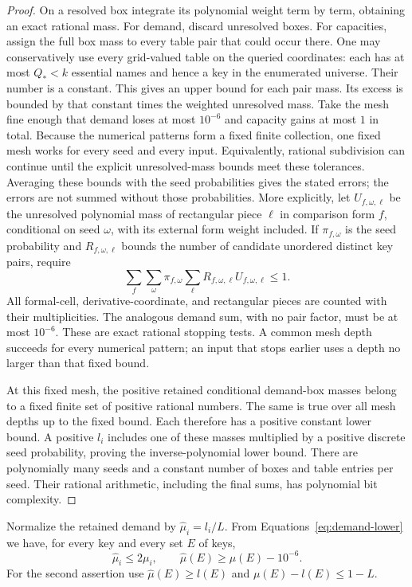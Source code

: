 \begin{proof}
On a resolved box integrate its polynomial weight term by term, obtaining
an exact rational mass.  For demand, discard unresolved boxes.  For
capacities, assign the full box mass to every table pair that could occur
there. One may conservatively use every grid-valued table on the queried
coordinates: each has at most $Q_*<k$ essential names and hence a key in
the enumerated universe. Their number is a constant. This gives an upper bound for
each pair mass.  Its excess is bounded by that constant times the weighted
unresolved mass.  Take the mesh fine enough that demand loses at most
$10^{-6}$ and capacity gains at most $1$ in total.  Because the numerical
patterns form a fixed finite collection, one fixed mesh works for every
seed and every input.  Equivalently, rational subdivision can continue
until the explicit unresolved-mass bounds meet these tolerances.  Averaging
these bounds with the seed probabilities gives the stated errors; the
errors are not summed without those probabilities. More explicitly, let
$U_{f,\omega,\ell}$ be the unresolved polynomial mass of rectangular
piece $\ell$ in comparison form $f$, conditional on seed $\omega$,
with its external form weight included. If $\pi_{f,\omega}$ is the seed
probability and $R_{f,\omega,\ell}$ bounds the number of candidate
unordered distinct key pairs, require
\[
 \sum_f\sum_\omega\pi_{f,\omega}
       \sum_\ell R_{f,\omega,\ell}U_{f,\omega,\ell}\le1.
\]
All formal-cell, derivative-coordinate, and rectangular pieces are
counted with their multiplicities. The analogous demand sum, with no
pair factor, must be at most $10^{-6}$. These are exact rational stopping
tests. A common mesh depth succeeds for every numerical pattern; an
input that stops earlier uses a depth no larger than that fixed bound.

At this fixed mesh, the positive retained conditional demand-box masses
belong to a fixed finite set of positive rational numbers. The same is
true over all mesh depths up to the fixed bound. Each therefore
has a positive constant lower bound.  A positive $l_i$ includes one of
these masses multiplied by a positive discrete seed probability, proving
the inverse-polynomial lower bound.  There are polynomially many seeds
and a constant number of boxes and table entries per seed.  Their rational
arithmetic, including the final sums, has polynomial bit complexity.
\end{proof}

Normalize the retained demand by $\widehat\mu_i=l_i/L$.  From
Equations~\eqref{eq:demand-lower} we have, for every key and every set $E$ of
keys,
\begin{equation}\label{eq:retained-demand}
 \widehat\mu_i\le2\mu_i,\qquad
 \widehat\mu(E)\ge\mu(E)-10^{-6}.
\end{equation}
For the second assertion use $\widehat\mu(E)\ge l(E)$ and
$\mu(E)-l(E)\le1-L$.

